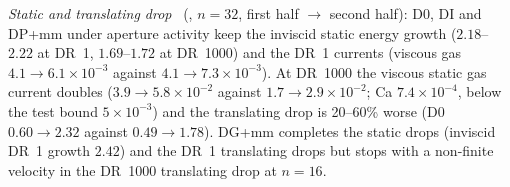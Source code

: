 \emph{Static and translating drop} \meas\ (, $n=32$, first half $\to$ second
half): D0, DI and DP+mm under aperture activity keep the inviscid static energy growth
($2.18$--$2.22$ at DR~1, $1.69$--$1.72$ at DR~1000) and the DR~1 currents (viscous gas
$4.1\to6.1\times10^{-3}$ against $4.1\to7.3\times10^{-3}$).  At DR~1000 the viscous static gas
current doubles ($3.9\to5.8\times10^{-2}$ against $1.7\to2.9\times10^{-2}$; Ca $7.4\times10^{-4}$,
below the test bound $5\times10^{-3}$) and the translating drop is 20--60\% worse (D0
$0.60\to2.32$ against $0.49\to1.78$).  DG+mm completes the static drops (inviscid DR~1 growth
$2.42$) and the DR~1 translating drops but stops with a non-finite velocity in the DR~1000
translating drop at $n=16$.
